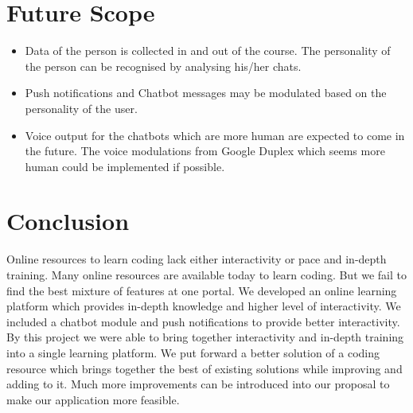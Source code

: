 \chapter{Future Scope}
\begin{itemize}	
\item{Data of the person is collected in and out of the course. The personality of the person can be
recognised by analysing his/her chats.}

\item{Push notifications and Chatbot messages may be modulated based on the personality of the user.}

\item{Voice output for the chatbots which are more human are expected to come in the future. The voice modulations from Google Duplex which seems more human could be implemented if possible.}
\end{itemize}

\chapter{Conclusion}
Online resources to learn coding lack either interactivity or pace and in-depth training. Many online resources are available today to learn coding. But we fail to find the best mixture of features at one portal. We developed an online learning platform which provides in-depth knowledge and higher level of interactivity. We included a chatbot module and push notifications to provide better interactivity. 
By this project we were able to bring together interactivity and in-depth training into a single learning platform. We put forward a better solution of a coding resource which brings together the best of existing solutions while improving and adding to it. Much more improvements can be introduced into our proposal to make our application more feasible.

\clearpage



